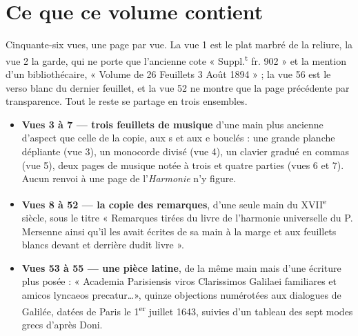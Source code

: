 \documentclass[11pt,a4paper]{article}
\begin{document}
\section*{Ce que ce volume contient}

Cinquante-six vues, une page par vue. La vue 1 est le plat marbré de la
reliure, la vue 2 la garde, qui ne porte que l'ancienne cote « Suppl.\textsuperscript{t}
fr. 902 » et la mention d'un bibliothécaire, « Volume de 26 Feuillets 3 Août
1894 » ; la vue 56 est le verso blanc du dernier feuillet, et la vue 52 ne
montre que la page précédente par transparence. Tout le reste se partage en
trois ensembles.

\begin{itemize}
  \item \textbf{Vues 3 à 7 — trois feuillets de musique} d'une main plus ancienne
    d'aspect que celle de la copie, aux s et aux e bouclés : une grande planche
    dépliante (vue 3), un monocorde divisé (vue 4), un clavier gradué en commas
    (vue 5), deux pages de musique notée à trois et quatre parties (vues 6
    et 7). Aucun renvoi à une page de l'\emph{Harmonie} n'y figure.
  \item \textbf{Vues 8 à 52 — la copie des remarques}, d'une seule main du
    XVII\textsuperscript{e} siècle, sous le titre « Remarques tirées du livre de
    l'harmonie universelle du P. Mersenne ainsi qu'il les avait écrites de sa
    main à la marge et aux feuillets blancs devant et derrière dudit livre ».
  \item \textbf{Vues 53 à 55 — une pièce latine}, de la même main mais d'une
    écriture plus posée : « Academia Parisiensis viros Clarissimos Galilaei
    familiares et amicos lyncaeos precatur\dots », quinze objections numérotées
    aux dialogues de Galilée, datées de Paris le 1\textsuperscript{er} juillet
    1643, suivies d'un tableau des sept modes grecs d'après Doni.
\end{itemize}
\end{document}
